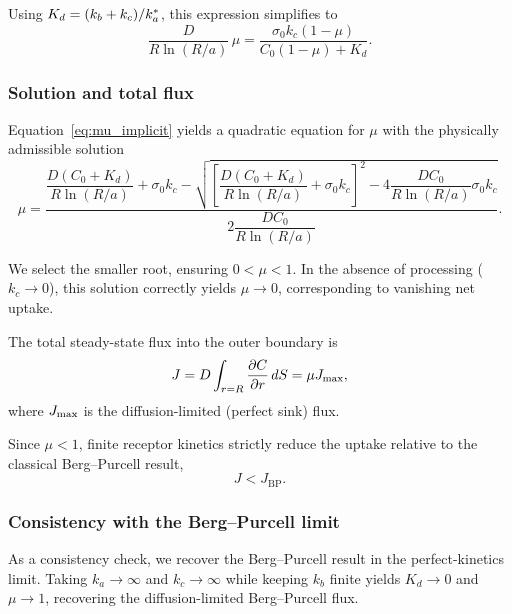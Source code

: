 Using $K_d = (k_b + k_c)/k_a^{*}$, this expression simplifies to
\begin{equation}
    \frac{D}{R \ln(R/a)}\,\mu = \frac{\sigma_0 k_c (1-\mu)}{C_{0}(1-\mu) + K_d}.
    \label{eq:mu_implicit}
\end{equation}

\subsubsection{Solution and total flux}
\label{sec:solution_flux}

Equation~\eqref{eq:mu_implicit} yields a quadratic equation for $\mu$ with the physically admissible solution
\begin{equation}
    \mu = \frac{\dfrac{D(C_{0} + K_d)}{R \ln(R/a)} + \sigma_0 k_c - \sqrt{\left[\dfrac{D(C_{0} + K_d)}{R \ln(R/a)} + \sigma_0 k_c\right]^{2} - 4\dfrac{D C_{0}}{R \ln(R/a)} \sigma_0 k_c}}{2 \dfrac{D C_{0}}{R \ln(R/a)}}.
    \label{eq:mu_quadratic}
\end{equation}

We select the smaller root, ensuring $0 < \mu < 1$. In the absence of processing ($k_c \to 0$), this solution correctly yields $\mu \to 0$, corresponding to vanishing net uptake.

The total steady-state flux into the outer boundary is
\begin{equation}
    J = D \int_{r=R} \frac{\partial C}{\partial r}\,dS = \mu J_{\mathrm{max}},
    \label{eq:J_mu_final}
\end{equation}
where $J_{\mathrm{max}}$ is the diffusion-limited (perfect sink) flux.

Since $\mu < 1$, finite receptor kinetics strictly reduce the uptake relative to the classical Berg--Purcell result,
\begin{equation}
    J < J_{\mathrm{BP}}.
    \label{eq:J_less_JBP}
\end{equation}

\subsubsection{Consistency with the Berg--Purcell limit}
\label{sec:consistency_BP}

As a consistency check, we recover the Berg--Purcell result in the perfect-kinetics limit. Taking $k_a \to \infty$ and $k_c \to \infty$ while keeping $k_b$ finite yields $K_d \to 0$ and $\mu \to 1$, recovering the diffusion-limited Berg--Purcell flux.
